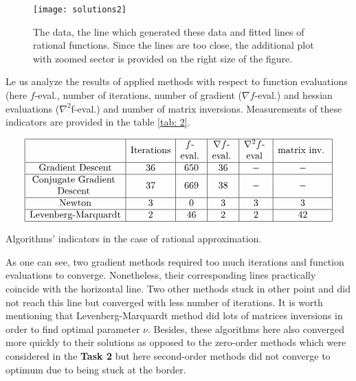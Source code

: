\documentclass[12pt, bachelor, substylefile = algo_title.rtx]{disser}
\makeatletter
\newcommand{\specialcell}[2][c]{%
  \begin{tabular}[#1]{@{}c@{}}#2\end{tabular}}
\theoremstyle{definition}
\makeatother
\begin{document}
\begin{figure}[h]
\begin{center}
\texttt{[image: solutions2]}
\caption{The data, the line which generated these data and fitted lines of rational functions. Since the lines are too close, the additional plot with zoomed sector is provided on the right size of the figure.}
\label{fig: 4}
\end{center}
\end{figure}

Le us analyze the results of applied methods with respect to function evaluations (here $f$-eval., number of iterations, number of gradient ($\nabla f$-eval.) and hessian evaluations ($\nabla^2 $f-eval.) and number of matrix inversions. Measurements of these indicators are provided in the table \ref{tab: 2}.

\begin{table}[h]
$$
\begin{array}{|c|c|c|c|c|c|}
\hline
 & \text{Iterations} & \text{\specialcell{ $f$-\\eval.} }& \text{\specialcell{ $\nabla f$-\\eval.} } & \text{\specialcell{ $\nabla^2 f$-\\eval} } & \text{\specialcell{ matrix inv. } }\\
\hline
\text{Gradient Descent} & 36 & 650 & 36 & - & - \\ 
\hline
\text{\specialcell{ Conjugate Gradient\\ Descent } } & 37 & 669 & 38 & - & - \\
\hline
\text{Newton} & 3 & 0 & 3 & 3& 3 \\
\hline
\text{Levenberg-Marquardt} & 2 & 46 & 2 & 2 & 42  \\
\hline
\end{array}
$$
\caption{Algorithms' indicators in the case of rational approximation.}
\label{tab: 2}
\end{table}

As one can see, two gradient methods required too much iterations and function evaluations to converge. Nonetheless, their corresponding lines practically coincide with the horizontal line. Two other methods stuck in other point and did not reach this line but converged with less number of iterations. It is worth mentioning that Levenberg-Marquardt method did lots of matrices inversions in order to find optimal parameter $\nu$.  Besides, these algorithms here also converged more quickly to their solutions as opposed to the zero-order methods which were considered in the \textbf{Task 2} but here second-order methods did not converge to optimum due to being stuck at the border.
\end{document}
